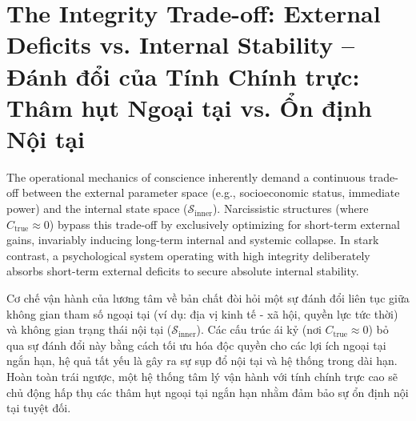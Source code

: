 \documentclass{report}
\begin{document}
\section{The Integrity Trade-off: External Deficits vs. Internal Stability -- Đánh đổi của Tính Chính trực: Thâm hụt Ngoại tại vs. Ổn định Nội tại}

The operational mechanics of conscience inherently demand a continuous trade-off between the external parameter space (e.g., socioeconomic status, immediate power) and the internal state space ($\mathcal{S}_{\text{inner}}$). Narcissistic structures (where $C_{\text{true}} \approx 0$) bypass this trade-off by exclusively optimizing for short-term external gains, invariably inducing long-term internal and systemic collapse. In stark contrast, a psychological system operating with high integrity deliberately absorbs short-term external deficits to secure absolute internal stability.

Cơ chế vận hành của lương tâm về bản chất đòi hỏi một sự đánh đổi liên tục giữa không gian tham số ngoại tại (ví dụ: địa vị kinh tế - xã hội, quyền lực tức thời) và không gian trạng thái nội tại ($\mathcal{S}_{\text{inner}}$). Các cấu trúc ái kỷ (nơi $C_{\text{true}} \approx 0$) bỏ qua sự đánh đổi này bằng cách tối ưu hóa độc quyền cho các lợi ích ngoại tại ngắn hạn, hệ quả tất yếu là gây ra sự sụp đổ nội tại và hệ thống trong dài hạn. Hoàn toàn trái ngược, một hệ thống tâm lý vận hành với tính chính trực cao sẽ chủ động hấp thụ các thâm hụt ngoại tại ngắn hạn nhằm đảm bảo sự ổn định nội tại tuyệt đối.
\end{document}
